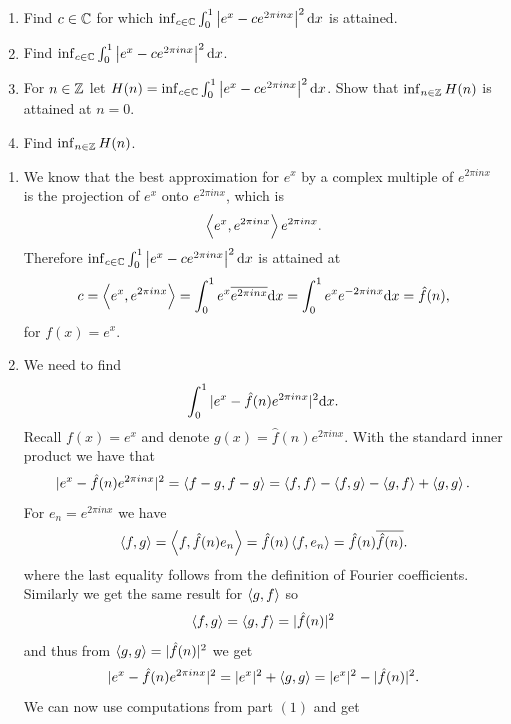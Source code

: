 \documentclass[11pt,a4paper]{article}
\begin{document}
\begin{exercise} \phantom{}
  \begin{enumerate}
    \item[(1)] Find $c \in \mathbb{C}$ for which
      $\inf_{c \in \C} \int_{0}^{1} \abs{e^x - c e^{2\pi i n x}}^2 \dx$
      is attained.
    \item[(2)] Find
      $\inf_{c \in \C} \int_{0}^{1} \abs{e^x - c e^{2\pi i n x}}^2 \dx$.
    \item[(3)] For $n \in \mathbb{Z}$ let
      $H(n) = \inf_{c \in \C} \int_{0}^{1} \abs{e^x - c e^{2\pi i n x}}^2 \dx$.
      Show that $\inf_{n \in \mathbb{Z}} H(n)$ is attained at $n = 0$.
    \item[(4)] Find $\inf_{n \in \mathbb{Z}} H(n)$.
  \end{enumerate}
\end{exercise}
\begin{solution} \phantom{}
  \begin{enumerate}
    \item[(1)] We know that the best approximation for $e^x$ by a complex
      multiple of $e^{2\pi i n x}$ is the projection of $e^x$
      onto $e^{2\pi i n x}$, which is
      \[
        \left\langle e^x, e^{2\pi i n x} \right\rangle e^{2\pi i n x}.
      \]
      Therefore
      $\inf_{c \in \C} \int_{0}^{1} \abs{e^x - c e^{2\pi i n x}}^2 \dx$
      is attained at
      \[
        c =
        \ip{e^x}{e^{2\pi i n x}} =
        \int_{0}^{1} e^x \overline{e^{2\pi i n x}} \dx =
        \int_{0}^{1} e^x e^{- 2\pi i n x} \dx =
        \hat f(n),
      \]
      for $f(x) = e^x$.
    \item[(2)] We need to find
      \[
        \int_{0}^{1} |e^x - \hat f(n) e^{2\pi i n x}|^2 \dx.
      \]
      Recall $f(x) = e^x$ and denote $g(x) = \hat f(n) e^{2\pi i n x}$.
      With the standard inner product we have that
      \[
        |e^x - \hat f(n) e^{2\pi i n x}|^2 =
        \left\langle f - g, f - g \right\rangle =
        \left\langle f, f \right\rangle - \left\langle f, g \right\rangle - \left\langle g, f \right\rangle + \left\langle g, g \right\rangle.
      \]
      For $e_n = e^{2 \pi i n x}$ we have
      \[
        \left\langle f, g \right\rangle =
        \left\langle f, \hat f(n) e_n \right\rangle =
        \hat f(n) \left\langle f, e_n \right\rangle =
        \hat f(n) \overline{\hat f(n)}.
      \]
      where the last equality follows from the definition of Fourier
      coefficients.
      Similarly we get the same result for $\left\langle g, f \right\rangle$ so
      \[
        \left\langle f, g \right\rangle = \left\langle g, f \right\rangle = |\hat f(n)|^2
      \]
      and thus from $\left\langle g, g \right\rangle = |\hat f(n)|^2$ we get
      \[
        |e^x - \hat f(n) e^{2\pi i n x}|^2 =
        |e^x|^2 + \left\langle g, g \right\rangle =
        |e^x|^2 - |\hat f(n)|^2.
      \]
      We can now use computations from part $(1)$ and get

\end{enumerate}
\end{solution}
\end{document}

